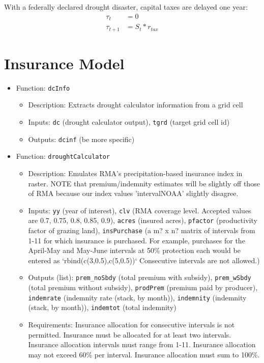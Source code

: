 \documentclass[11pt]{article}
\begin{document}
With a federally declared drought disaster, capital taxes are delayed one year:
\begin{align}
\tau_t &= 0 \\
\tau_{t+1} &= S_t * r_{tax}
\end{align}



\section{Insurance Model}

\begin{itemize}	
\item Function: \verb!dcInfo! 
	\begin{itemize}
	\item Description: Extracts drought calculator information from a grid cell
	\item Inputs: \verb!dc! (drought calculator output), \verb!tgrd! (target grid cell id)
	\item Outputs: \verb!dcinf! (be more specific)
	\end{itemize}
\end{itemize}

\begin{itemize}
\item Function: \verb!droughtCalculator!
	\begin{itemize}
	\item Description: Emulates RMA's precipitation-based insurance index in raster. NOTE
  that premium/indemnity estimates will be slightly off those of RMA because our index values 'intervalNOAA' slightly disagree.
	\item Inputs: \verb!yy! (year of interest), \verb!clv! (RMA coverage level. Accepted values are 0.7, 0.75, 0.8, 0.85, 0.9), \verb!acres! (insured acres), \verb!pfactor! (productivity factor of grazing land), \verb!insPurchase! (a m? x n? matrix of intervals from 1-11 for which insurance is purchased. For example, purchases for the April-May and May-June intervals at 50\% protection each would be entered as `rbind(c(3,0.5),c(5,0.5))` Consecutive intervals are not allowed.)
	\item Outputs (list): \verb!prem_noSbdy! (total premium with subsidy), \verb!prem_wSbdy! (total premium without subsidy), \verb!prodPrem! (premium paid by producer), \verb!indemrate! (indemnity rate (stack, by month)), \verb!indemnity! (indemnity (stack, by month)), \verb!indemtot! (total indemnity)  
	\item Requirements: Insurance allocation for consecutive intervals is not permitted. Insurance must be allocated for at least two intervals. Insurance allocation intervals must range from 1-11. Insurance allocation may not exceed 60\% per interval. Insurance allocation must sum to 100\%.
	\end{itemize}
\end{itemize}
\end{document}
